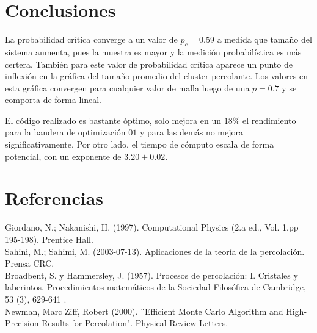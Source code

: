 \documentclass{article}
\begin{document}
\begin{multicols}{2}
\section{Conclusiones}

La probabilidad crítica converge a un valor de $p_c=0.59$ a medida que tamaño del sistema aumenta, pues la muestra es mayor y la medición probabilística es más certera. También para este valor de probabilidad crítica aparece un punto de inflexión en la gráfica del tamaño promedio del cluster percolante. Los valores en esta gráfica convergen para cualquier valor de malla luego de una $p=0.7$ y se comporta de forma lineal.

El código realizado es bastante óptimo, solo mejora en un $18\%$ el rendimiento para la bandera de optimización $01$ y para las demás no mejora significativamente. Por otro lado, el tiempo de cómputo escala de forma potencial, con un exponente de $3.20\pm0.02$.



\section{Referencias}

\noindent [1] Giordano, N.; Nakanishi, H. (1997). Computational Physics (2.a ed., Vol. 1,pp 195-198). Prentice Hall.\\

\noindent [2] Sahini, M.; Sahimi, M. (2003-07-13). Aplicaciones de la teoría de la percolación. Prensa CRC.\\
  
\noindent [3] Broadbent, S. y Hammersley, J. (1957). Procesos de percolación: I. Cristales y laberintos. Procedimientos matemáticos de la Sociedad Filosófica de Cambridge, 53 (3), 629-641 .\\
  
\noindent [4] Newman, Marc Ziff, Robert (2000). ¨Efficient Monte Carlo Algorithm and High-Precision Results for Percolation". Physical Review Letters.
  

  
  
\end{multicols}{}
\end{document}
